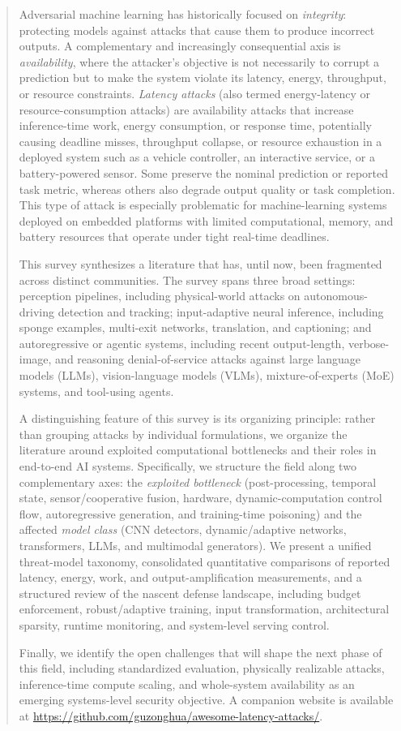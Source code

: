 \documentclass[acmsmall,screen,review,nonacm]{acmart}
\begin{document}
\begin{abstract}
Adversarial machine learning has historically focused on \emph{integrity}: protecting models against attacks that cause them to produce incorrect outputs. A complementary and increasingly consequential axis is \emph{availability}, where the attacker's objective is not necessarily to corrupt a prediction but to make the system violate its latency, energy, throughput, or resource constraints. \emph{Latency attacks} (also termed energy-latency or resource-consumption attacks) are availability attacks that increase inference-time work, energy consumption, or response time, potentially causing deadline misses, throughput collapse, or resource exhaustion in a deployed system such as a vehicle controller, an interactive service, or a battery-powered sensor. Some preserve the nominal prediction or reported task metric, whereas others also degrade output quality or task completion. This type of attack is especially problematic for machine-learning systems deployed on embedded platforms with limited computational, memory, and battery resources that operate under tight real-time deadlines.

This survey synthesizes a literature that has, until now, been fragmented across distinct communities. The survey spans three broad settings: perception pipelines, including physical-world attacks on autonomous-driving detection and tracking; input-adaptive neural inference, including sponge examples, multi-exit networks, translation, and captioning; and autoregressive or agentic systems, including recent output-length, verbose-image, and reasoning denial-of-service attacks against large language models (LLMs), vision-language models (VLMs), mixture-of-experts (MoE) systems, and tool-using agents.

A distinguishing feature of this survey is its organizing principle: rather than grouping attacks by individual formulations, we organize the literature around exploited computational bottlenecks and their roles in end-to-end AI systems. Specifically, we structure the field along two complementary axes: the \emph{exploited bottleneck} (post-processing, temporal state, sensor/cooperative fusion, hardware, dynamic-computation control flow, autoregressive generation, and training-time poisoning) and the affected \emph{model class} (CNN detectors, dynamic/adaptive networks, transformers, LLMs, and multimodal generators). We present a unified threat-model taxonomy, consolidated quantitative comparisons of reported latency, energy, work, and output-amplification measurements, and a structured review of the nascent defense landscape, including budget enforcement, robust/adaptive training, input transformation, architectural sparsity, runtime monitoring, and system-level serving control.

Finally, we identify the open challenges that will shape the next phase of this field, including standardized evaluation, physically realizable attacks, inference-time compute scaling, and whole-system availability as an emerging systems-level security objective. A companion website is available at \url{https://github.com/guzonghua/awesome-latency-attacks/}.
\end{abstract}
\end{document}
